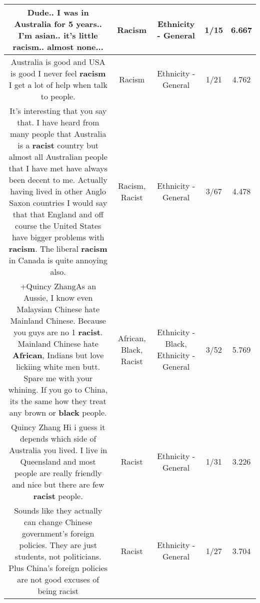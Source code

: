 \documentclass[11pt]{article}
\newlength\mylength
\begin{document}
\begin{center}
\begin{longtable}{|C{.65\mylength}|C{.30\mylength}|C{.12\mylength}|C{.12\mylength}|C{.12\mylength}|}
  \small Dude.. I was in Australia for 5 years.. I'm asian.. it's little \textbf{racism}.. almost none...\normalsize   & Racism & Ethnicity - General & 1/15 & 6.667 \\  \hline
  \small Australia is good and USA is good I never feel \textbf{racism} I get a lot of help when talk to people.\normalsize   & Racism & Ethnicity - General & 1/21 & 4.762 \\  \hline
  \small It's interesting that you say that. I have heard from many people that Australia is a \textbf{racist} country but almost all Australian people that I have met have always been decent to me. Actually having lived in other Anglo Saxon countries I would say that that England and off course the United States have bigger problems with \textbf{racism}. The liberal \textbf{racism} in Canada is quite annoying also.\normalsize   & Racism, Racist & Ethnicity - General & 3/67 & 4.478 \\  \hline
  \small +Quincy ZhangAs an Aussie, I know even Malaysian Chinese hate Mainland Chinese. Because you guys are no 1 \textbf{racist}. Mainland Chinese hate \textbf{African}, Indians but love lickiing white men butt. Spare me with your whining. If you go to China, its the same how they treat any brown or \textbf{black} people.\normalsize   & African, Black, Racist & Ethnicity - Black, Ethnicity - General & 3/52 & 5.769 \\  \hline
  \small Quincy Zhang Hi i guess it depends which side of Australia you lived. I live in Queensland and most people are really friendly and nice but there are few \textbf{racist} people.\normalsize   & Racist & Ethnicity - General & 1/31 & 3.226 \\  \hline
  \small Sounds like they actually can change Chinese government's foreign policies. They are just students, not politicians. Plus China's foreign policies are not good excuses of being racist\normalsize   & Racist & Ethnicity - General & 1/27 & 3.704 \\  \hline

\end{longtable}
\end{center}
\end{document}
